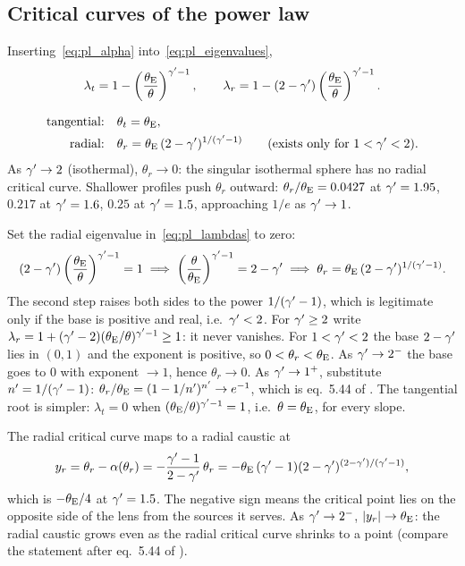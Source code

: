 \subsection{Critical curves of the power law}

Inserting~\eqref{eq:pl_alpha} into~\eqref{eq:pl_eigenvalues},
\begin{equation}
    \lambda_t = 1-\left(\frac{\theta_{\mathrm{E}}}{\theta}\right)^{\gamma'-1} ,
    \qquad
    \lambda_r = 1-(2-\gamma')\left(\frac{\theta_{\mathrm{E}}}{\theta}\right)^{\gamma'-1} .
    \label{eq:pl_lambdas}
\end{equation}

\begin{keybox}
\begin{align}
    \text{tangential:}\quad & \theta_t=\theta_{\mathrm{E}} ,
    \label{eq:pl_theta_t}\\
    \text{radial:}\quad & \theta_r=\theta_{\mathrm{E}}\,(2-\gamma')^{1/(\gamma'-1)}
    \qquad(\text{exists only for }1<\gamma'<2) .
    \label{eq:pl_theta_r}
\end{align}
As $\gamma'\to2$ (isothermal), $\theta_r\to0$: the singular isothermal
sphere has no radial critical curve.  Shallower profiles push
$\theta_r$ outward: $\theta_r/\theta_{\mathrm{E}}=0.0427$ at $\gamma'=1.95$, $0.217$ at
$\gamma'=1.6$, $0.25$ at $\gamma'=1.5$, approaching $1/e$ as $\gamma'\to1$.
\end{keybox}

\begin{derivation}[Solving $\lambda_r=0$]
Set the radial eigenvalue in~\eqref{eq:pl_lambdas} to zero:
\[
  (2-\gamma')\left(\frac{\theta_{\mathrm{E}}}{\theta}\right)^{\gamma'-1}=1
  \;\Longrightarrow\;
  \left(\frac{\theta}{\theta_{\mathrm{E}}}\right)^{\gamma'-1}=2-\gamma'
  \;\Longrightarrow\;
  \theta_r=\theta_{\mathrm{E}}\,(2-\gamma')^{1/(\gamma'-1)} .
\]
The second step raises both sides to the power $1/(\gamma'-1)$, which is
legitimate only if the base is positive and real, i.e.\ $\gamma'<2$.  For
$\gamma'\ge2$ write $\lambda_r=1+(\gamma'-2)(\theta_{\mathrm{E}}/\theta)^{\gamma'-1}\ge1$: it
never vanishes.  For $1<\gamma'<2$ the base $2-\gamma'$ lies in $(0,1)$ and the
exponent is positive, so $0<\theta_r<\theta_{\mathrm{E}}$.  As $\gamma'\to2^-$ the base
goes to $0$ with exponent $\to1$, hence $\theta_r\to0$.  As
$\gamma'\to1^+$, substitute $n'=1/(\gamma'-1)$: $\theta_r/\theta_{\mathrm{E}}=(1-1/n')^{n'}\to
e^{-1}$, which is eq.~5.44 of \citet{meneghetti_introduction_2021}.  The
tangential root is simpler: $\lambda_t=0$ when $(\theta_{\mathrm{E}}/\theta)^{\gamma'-1}=1$,
i.e.\ $\theta=\theta_{\mathrm{E}}$, for every slope.
\end{derivation}

The radial critical curve maps to a radial caustic at
\begin{equation}
    y_r = \theta_r-\alpha(\theta_r)
            = -\frac{\gamma'-1}{2-\gamma'}\,\theta_r
            = -\theta_{\mathrm{E}}\,(\gamma'-1)(2-\gamma')^{(2-\gamma')/(\gamma'-1)} ,
    \label{eq:pl_radial_caustic}
\end{equation}
which is $-\theta_{\mathrm{E}}/4$ at $\gamma'=1.5$.  The negative sign means the
critical point lies on the opposite side of the lens from the sources
it serves.  As $\gamma'\to2^-$, $|y_r|\to\theta_{\mathrm{E}}$: the radial caustic
grows even as the radial critical curve shrinks to a point (compare the
statement after eq.~5.44 of \citet{meneghetti_introduction_2021}).

